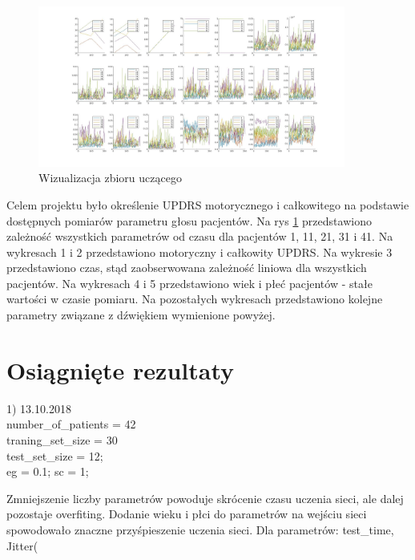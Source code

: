 \documentclass[12pt]{article}
\begin{document}
\begin{figure}
	\includegraphics[width=0.90\textwidth]{data.jpg}\par\vspace{1cm}
\caption{Wizualizacja zbioru uczącego}
\label{data visualisation}
\end{figure}

Celem projektu było określenie UPDRS motorycznego i całkowitego na podstawie dostępnych pomiarów parametru głosu pacjentów. Na rys \ref{data visualisation} przedstawiono zależność wszystkich parametrów od czasu dla pacjentów 1, 11, 21, 31 i 41. Na wykresach 1 i 2 przedstawiono motoryczny i całkowity UPDRS. Na wykresie 3 przedstawiono czas, stąd zaobserwowana zależność liniowa dla wszystkich pacjentów. Na wykresach 4 i 5 przedstawiono wiek i płeć pacjentów - stałe wartości w czasie pomiaru. Na pozostałych wykresach przedstawiono kolejne parametry związane z dźwiękiem wymienione powyżej.

\newpage
\section{Osiągnięte rezultaty}

1) 13.10.2018 \\


number\_of\_patients = 42\\
traning\_set\_size = 30\\
test\_set\_size = 12;\\

eg = 0.1; %
sc = 1;    %

Zmniejszenie liczby parametrów powoduje skrócenie czasu uczenia sieci, ale dalej pozostaje overfiting. Dodanie wieku i płci do parametrów na wejściu sieci spowodowało znaczne przyśpieszenie uczenia sieci. Dla parametrów: test\_time, Jitter(%
\end{document}
